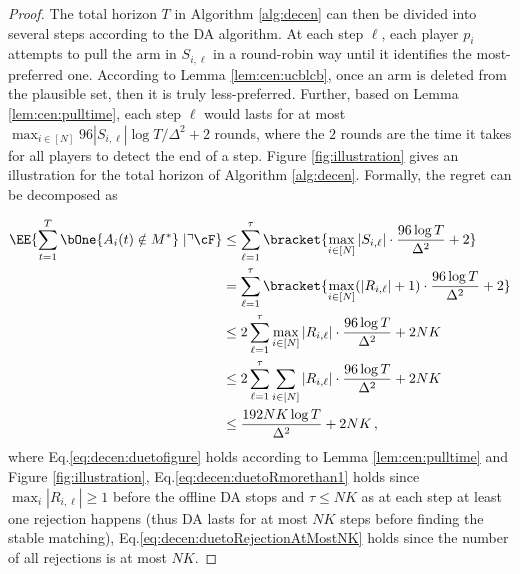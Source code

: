 \begin{proof}
The total horizon $T$ in Algorithm \ref{alg:decen} can then be divided into several steps according to the DA algorithm. At each step $\ell$, each player $p_i$ attempts to pull the arm in $S_{i,\ell}$ in a round-robin way until it identifies the most-preferred one. 
According to Lemma \ref{lem:cen:ucblcb}, once an arm is deleted from the plausible set, then it is truly less-preferred. 
Further, based on Lemma \ref{lem:cen:pulltime}, each step $\ell$ would lasts for at most $\max_{i\in[N]}96|S_{i,\ell}|\log T/\Delta^2+2$ rounds, where the $2$ rounds are the time it takes for all players to detect the end of a step.   
Figure \ref{fig:illustration} gives an illustration for the total horizon of Algorithm \ref{alg:decen}. Formally, the regret can be decomposed as



\begin{align}
    \EE{\sum_{t=1}^T \bOne{{A}_i(t) \notin M^*}\mid \urcorner \cF } 
    &\le \sum_{\ell=1}^\tau \bracket{\max_{i\in[N]}|S_{i,\ell}|\cdot \frac{96\log T}{\Delta^2} +2 }\label{eq:decen:duetofigure}\\
    &= \sum_{\ell=1}^\tau \bracket{\max_{i\in[N]}(|R_{i,\ell}|+1)\cdot \frac{96\log T}{\Delta^2}+2} \notag \\
    &\le 2\sum_{\ell=1}^\tau \max_{i\in[N]}|R_{i,\ell}|\cdot \frac{96\log T}{\Delta^2} +2NK \label{eq:decen:duetoRmorethan1}\\
    &\le 2\sum_{\ell=1}^\tau \sum_{i\in[N]}|R_{i,\ell}|\cdot \frac{96\log T}{\Delta^2} +2NK \notag \\
    &\le \frac{192NK\log T}{\Delta^2} +2NK  \label{eq:decen:duetoRejectionAtMostNK}\,,
\end{align}
where Eq.\eqref{eq:decen:duetofigure} holds according to Lemma \ref{lem:cen:pulltime} and Figure \ref{fig:illustration}, Eq.\eqref{eq:decen:duetoRmorethan1} holds since $\max_{i}|R_{i,\ell}|\ge 1$ before the offline DA stops and $\tau\le NK$ as at each step at least one rejection happens (thus DA lasts for at most $NK$ steps before finding the stable matching), Eq.\eqref{eq:decen:duetoRejectionAtMostNK} holds since the number of all rejections is at most $NK$. 


\end{proof}







